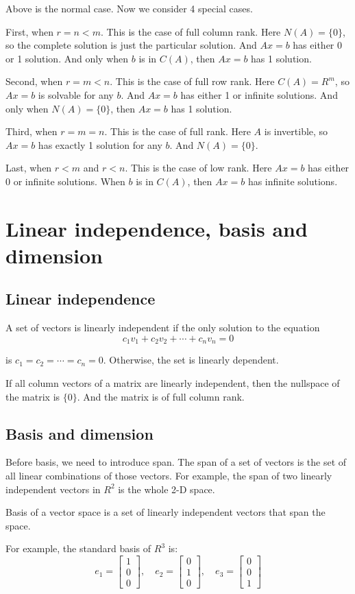 \documentclass[10pt,a4paper,oneside,numbers=noenddot]{scrbook}
\theoremstyle{ctplain}
\theoremstyle{ctresult}
\begin{document}
Above is the normal case. Now we consider 4 special cases.

First, when $r = n < m$. This is the case of full column rank. Here $N(A) = \{0\}$, so
the complete solution is just the particular solution. And $Ax = b$ has either 0 or 1
solution. And only when $b$ is in $C(A)$, then $Ax = b$ has 1 solution.

Second, when $r = m < n$. This is the case of full row rank. Here $C(A) = R^{m}$, so
$Ax = b$ is solvable for any $b$. And $Ax = b$ has either 1 or infinite solutions.
And only when $N(A) = \{0\}$, then $Ax = b$ has 1 solution.

Third, when $r = m = n$. This is the case of full rank. Here $A$ is invertible, so
$Ax = b$ has exactly 1 solution for any $b$. And $N(A) = \{0\}$.

Last, when $r < m$ and $r < n$. This is the case of low rank. Here $Ax = b$ has either 0 or
infinite solutions. When $b$ is in $C(A)$, then $Ax = b$ has infinite solutions.

\section{Linear independence, basis and dimension}
\subsection{Linear independence}

A set of vectors is linearly independent if the only solution to the equation
\[
  c_1 v_1 + c_2 v_2 + \cdots + c_n v_n = 0
\]

is $c_1 = c_2 = \cdots = c_n = 0$. Otherwise, the set is linearly dependent.

If all column vectors of a matrix are linearly independent, then the nullspace of
the matrix is $\{0\}$. And the matrix is of full column rank.

\subsection{Basis and dimension}

Before basis, we need to introduce span. The span of a set of vectors is the set of all
linear combinations of those vectors. For example, the span of two linearly independent
vectors in $R^{2}$ is the whole 2-D space.

Basis of a vector space is a set of linearly independent vectors that span the space.

For example, the standard basis of $R^{3}$ is:
\[
  e_1 = \begin{bmatrix} 1 \\ 0 \\ 0 \end{bmatrix}, \quad
  e_2 = \begin{bmatrix} 0 \\ 1 \\ 0 \end{bmatrix}, \quad
  e_3 = \begin{bmatrix} 0 \\ 0 \\ 1 \end{bmatrix}
\]
\end{document}
